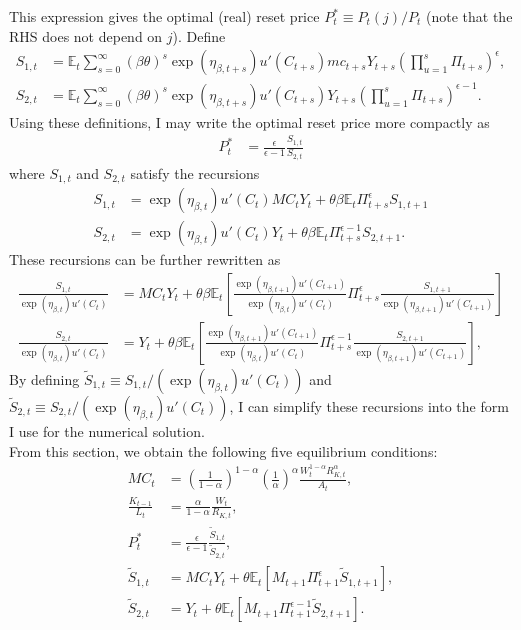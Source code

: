 \documentclass[12 pt, oneside]{article}
\theoremstyle{definition}
\theoremstyle{definition}
\theoremstyle{definition}
\newcommand{\E}{\mathbb{E}}
\begin{document}
This expression gives the optimal (real) reset price $P_t^* \equiv P_t(j) / P_t $ (note that the RHS does not depend on $j$).
Define
\begin{align*}
  S_{1, t} & = \E_t\sum_{s = 0}^\infty  (\beta\theta)^s \exp(\eta_{\beta, t + s})u'(C_{t + s}) mc_{t + s}Y_{t + s}\left( \prod_{u = 1}^s\Pi_{t + s}\right)^{\epsilon},\\
  S_{2, t}  & = \E_t\sum_{s = 0}^\infty (\beta\theta)^s \exp(\eta_{\beta, t + s})u'(C_{t + s})Y_{t + s}\left(\prod_{u = 1}^s\Pi_{t + s}\right)^{\epsilon - 1}.
\end{align*}
Using these definitions, I may write the optimal reset price more compactly as
\begin{align*}
  P_t^* & = \frac{\epsilon}{\epsilon - 1}\frac{S_{1, t}}{S_{2, t}}
\end{align*}
where $S_{1, t}$ and $S_{2, t}$ satisfy the recursions
\begin{align*}
  S_{1, t} & = \exp(\eta_{\beta, t})u'(C_t) MC_t Y_t + \theta \beta \E_t\Pi_{t + s}^\epsilon S_{1, t + 1}\\
  S_{2, t} & = \exp(\eta_{\beta, t})u'(C_t) Y_t + \theta \beta \E_t \Pi_{t + s}^{\epsilon - 1}S_{2, t + 1}.
\end{align*}
These recursions can be further rewritten as
\begin{align*}
  \frac{S_{1, t}}{\exp(\eta_{\beta, t})u'(C_t)} & =  MC_t Y_t + \theta \beta \E_t\left[\frac{\exp(\eta_{\beta, t + 1}) u'(C_{t + 1})}{\exp(\eta_{\beta, t}) u'(C_t)}\Pi_{t + s}^\epsilon \frac{S_{1, t + 1}}{\exp(\eta_{\beta, t + 1})u'(C_{t + 1})}\right]\\
  \frac{S_{2, t}}{\exp(\eta_{\beta, t})u'(C_t)} & =  Y_t + \theta \beta \E_t\left[\frac{\exp(\eta_{\beta, t + 1}) u'(C_{t + 1})}{\exp(\eta_{\beta, t}) u'(C_t)}\Pi_{t + s}^{\epsilon - 1} \frac{S_{2, t + 1}}{\exp(\eta_{\beta, t + 1})u'(C_{t + 1})}\right],
\end{align*}
By defining $\tilde{S}_{1, t} \equiv S_{1, t}/ (\exp(\eta_{\beta, t})u'(C_t))$ and $\tilde{S}_{2, t} \equiv S_{2, t}/ (\exp(\eta_{\beta, t})u'(C_t))$, I can simplify these recursions into the form I use for the numerical solution.\\

From this section, we obtain the following five equilibrium conditions:
\begin{align}
  \label{eq:mc soln}
  MC_t & =  \left(\frac{1}{1 - \alpha}\right)^{1 - \alpha}\left(\frac{1}{\alpha}\right)^{\alpha}\frac{W_t^{1 - \alpha}R_{K, t}^{\alpha}}{ A_t},\\
  \label{eq:optimal capital labor ratio}
  \frac{K_{t - 1}}{L_t} & =\frac{\alpha}{1 - \alpha} \frac{W_t}{R_{K, t}},\\
  \label{eq:real optimal reset price}
  P_t^* & = \frac{\epsilon}{\epsilon - 1}\frac{\tilde{S}_{1, t}}{\tilde{S}_{2, t}},\\
  \label{eq:numerator recursion}
  \tilde{S}_{1, t} & = MC_t Y_t + \theta\E_t[M_{t + 1} \Pi_{t + 1}^\epsilon \tilde{S}_{1, t + 1}],\\
  \label{eq:denominator recursion}
  \tilde{S}_{2, t} & =  Y_t + \theta\E_t[M_{t + 1} \Pi_{t + 1}^{\epsilon - 1} \tilde{S}_{2, t + 1}].
\end{align}
\end{document}
